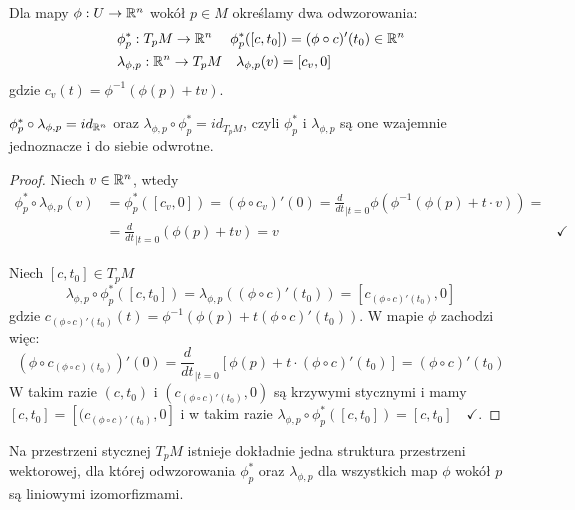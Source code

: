 Dla mapy $\phi:U\to \mathbb{R}^n$ wokół $p\in M$ określamy dwa odwzorowania:
\label{phi z gwiazdka}
\begin{align*}
  &\phi_p^*:T_pM\to\mathbb{R}^n\quad\; \phi_p^*([c, t_0])=(\phi\circ c)'(t_0)\in \mathbb{R}^n\\
  &\lambda_{\phi,p}:\mathbb{R}^n\to T_pM\quad \lambda_{\phi,p}(v)=[c_v, 0]
\end{align*}
gdzie $c_v(t)=\phi^{-1}(\phi(p)+tv)$.

\begin{lemma}
  $\phi^*_p\circ\lambda_{\phi, p}=id_{\mathbb{R}^n}$ oraz $\lambda_{\phi, p}\circ\phi_p^*=id_{T_pM}$, czyli $\phi_p^*$ i $\lambda_{\phi,p}$ są one wzajemnie jednoznacze i do siebie odwrotne.
\end{lemma}

\begin{proof}
  Niech $v\in\mathbb{R}^n$, wtedy
  \begin{align*}
    \phi_p^*\circ\lambda_{\phi, p}(v)&=\phi^*_p([c_v, 0])=(\phi\circ c_v)'(0)=\frac{d}{dt}_{{\scriptstyle|t=0}}\phi(\phi^{-1}(\phi(p)+t\cdot v))=\\
                                     &=\frac{d}{dt}_{{\scriptstyle|t=0}}(\phi(p)+tv)=v &\checkmark
  \end{align*}

  Niech $[c, t_0]\in T_pM$
  $$\lambda_{\phi, p}\circ\phi_p^*([c, t_0])=\lambda_{\phi, p}((\phi\circ c)'(t_0))=[c_{(\phi\circ c)'(t_0)}, 0]$$
  gdzie $c_{(\phi\circ c)'(t_0)}(t)=\phi^{-1}(\phi(p)+t(\phi\circ c)'(t_0))$. W mapie $\phi$ zachodzi więc:
  $$(\phi\circ c_{(\phi\circ c)(t_0)})'(0)=\frac{d}{dt}_{{\scriptstyle|t=0}}[\phi(p)+t\cdot(\phi\circ c)'(t_0)]=(\phi\circ c)'(t_0)$$
  W takim razie $(c, t_0)$ i $(c_{(\phi\circ c)'(t_0)}, 0)$ są krzywymi stycznymi i mamy $[c, t_0]=[(c_{(\phi\circ c)'(t_0)}, 0]$ i w takim razie $\lambda_{\phi, p}\circ\phi_p^*([c, t_0])=[c, t_0]\quad\checkmark$.
\end{proof}

\begin{fact}\label{przestrzen styczna jest wektorowa}
Na przestrzeni stycznej $T_pM$ istnieje dokładnie jedna struktura przestrzeni wektorowej, dla której odwzorowania $\phi_p^*$ oraz $\lambda_{\phi, p}$ dla wszystkich map $\phi$ wokół $p$ są liniowymi izomorfizmami. 
\end{fact}

